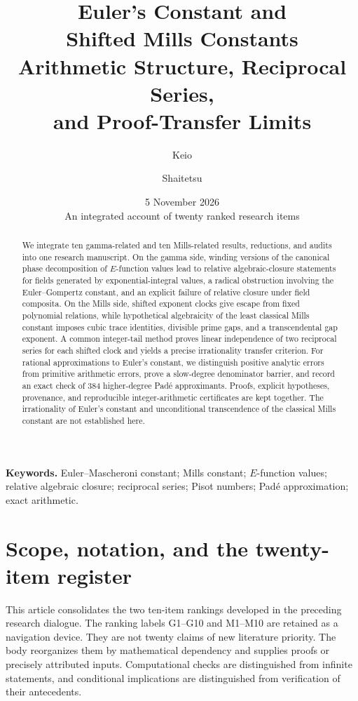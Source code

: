 \documentclass[11pt,a4paper]{article}
\title{\color{inkblue}\textbf{Euler's Constant and\\Shifted Mills Constants}\\[6pt]
\large Arithmetic Structure, Reciprocal Series,\\and Proof-Transfer Limits}
\author{Keio \and Shaitetsu}
\date{5 November 2026\\[3pt]\small An integrated account of twenty ranked research items}
\numberwithin{equation}{section}
\theoremstyle{definition}
\theoremstyle{remark}
\begin{document}
\maketitle
\thispagestyle{empty}
\begin{abstract}
We integrate ten gamma-related and ten Mills-related results, reductions,
and audits into one research manuscript.  On the gamma side, winding
versions of the canonical phase decomposition of $E$-function values lead
to relative algebraic-closure statements for fields generated by
exponential-integral values, a radical obstruction involving the
Euler--Gompertz constant, and an explicit failure of relative closure
under field composita.  On the Mills side, shifted exponent clocks give
escape from fixed polynomial relations, while hypothetical algebraicity
of the least classical Mills constant imposes cubic trace identities,
divisible prime gaps, and a transcendental gap exponent.  A common
integer-tail method proves linear independence of two reciprocal series
for each shifted clock and yields a precise irrationality transfer
criterion.  For rational approximations to Euler's constant, we distinguish
positive analytic errors from primitive arithmetic errors, prove a
slow-degree denominator barrier, and record an exact check of 384
higher-degree Pad\'e approximants.  Proofs, explicit hypotheses, provenance,
and reproducible integer-arithmetic certificates are kept together.
The irrationality of Euler's constant and unconditional transcendence of
the classical Mills constant are not established here.
\end{abstract}
\vfill
\noindent\textbf{Keywords.} Euler--Mascheroni constant; Mills constant;
$E$-function values; relative algebraic closure; reciprocal series;
Pisot numbers; Pad\'e approximation; exact arithmetic.
\clearpage
\tableofcontents
\clearpage

\section{Scope, notation, and the twenty-item register}
\label{intro:scope}

This article consolidates the two ten-item rankings developed in the
preceding research dialogue.  The ranking labels G1--G10 and M1--M10 are
retained as a navigation device.  They are not twenty claims of new
literature priority.  The body reorganizes them by mathematical dependency
and supplies proofs or precisely attributed inputs.  Computational checks
are distinguished from infinite statements, and conditional implications
are distinguished from verification of their antecedents.
\end{document}
